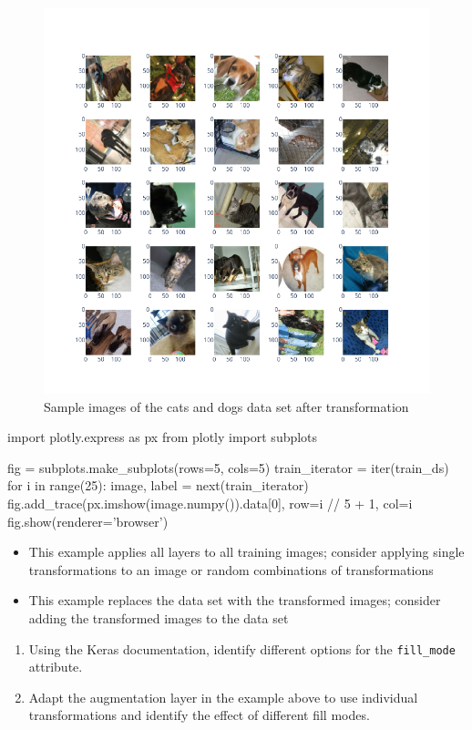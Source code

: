 \begin{figure}
\begin{center}
\includegraphics[width=.8\textwidth]{catsdogs_sample_transformed.png}
\end{center}
\caption{Sample images of the cats and dogs data set after transformation}
\label{fig:catsdogs_after}
\end{figure}

\begin{pythoncode}
import plotly.express as px
from plotly import subplots

fig = subplots.make_subplots(rows=5, cols=5)
train_iterator = iter(train_ds)
for i in range(25):
    image, label = next(train_iterator)
    fig.add_trace(px.imshow(image.numpy()).data[0], 
                  row=i // 5 + 1, col=i %
fig.show(renderer='browser')
\end{pythoncode}

\begin{infobox}
\begin{itemize}
   \item This example applies all layers to all training images; consider applying single transformations to an image or random combinations of transformations
   \item This example replaces the data set with the transformed images; consider adding the transformed images to the data set
\end{itemize}
\end{infobox}


\begin{exercisebox}
\begin{enumerate}
  \item Using the Keras documentation, identify different options for the \texttt{fill\_mode} attribute.
  \item Adapt the augmentation layer in the example above to use individual transformations and identify the effect of different fill modes.
\end{enumerate}
\end{exercisebox}


